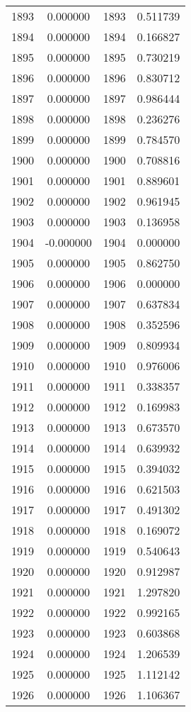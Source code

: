 \documentclass[12pt]{article}
\begin{document}
\begin{longtable}{@{}cccc@{}}
1893 & 0.000000 & 1893 & 0.511739 \\
1894 & 0.000000 & 1894 & 0.166827 \\
1895 & 0.000000 & 1895 & 0.730219 \\
1896 & 0.000000 & 1896 & 0.830712 \\
1897 & 0.000000 & 1897 & 0.986444 \\
1898 & 0.000000 & 1898 & 0.236276 \\
1899 & 0.000000 & 1899 & 0.784570 \\
1900 & 0.000000 & 1900 & 0.708816 \\
1901 & 0.000000 & 1901 & 0.889601 \\
1902 & 0.000000 & 1902 & 0.961945 \\
1903 & 0.000000 & 1903 & 0.136958 \\
1904 & -0.000000 & 1904 & 0.000000 \\
1905 & 0.000000 & 1905 & 0.862750 \\
1906 & 0.000000 & 1906 & 0.000000 \\
1907 & 0.000000 & 1907 & 0.637834 \\
1908 & 0.000000 & 1908 & 0.352596 \\
1909 & 0.000000 & 1909 & 0.809934 \\
1910 & 0.000000 & 1910 & 0.976006 \\
1911 & 0.000000 & 1911 & 0.338357 \\
1912 & 0.000000 & 1912 & 0.169983 \\
1913 & 0.000000 & 1913 & 0.673570 \\
1914 & 0.000000 & 1914 & 0.639932 \\
1915 & 0.000000 & 1915 & 0.394032 \\
1916 & 0.000000 & 1916 & 0.621503 \\
1917 & 0.000000 & 1917 & 0.491302 \\
1918 & 0.000000 & 1918 & 0.169072 \\
1919 & 0.000000 & 1919 & 0.540643 \\
1920 & 0.000000 & 1920 & 0.912987 \\
1921 & 0.000000 & 1921 & 1.297820 \\
1922 & 0.000000 & 1922 & 0.992165 \\
1923 & 0.000000 & 1923 & 0.603868 \\
1924 & 0.000000 & 1924 & 1.206539 \\
1925 & 0.000000 & 1925 & 1.112142 \\
1926 & 0.000000 & 1926 & 1.106367 \\

\end{longtable}
\end{document}
